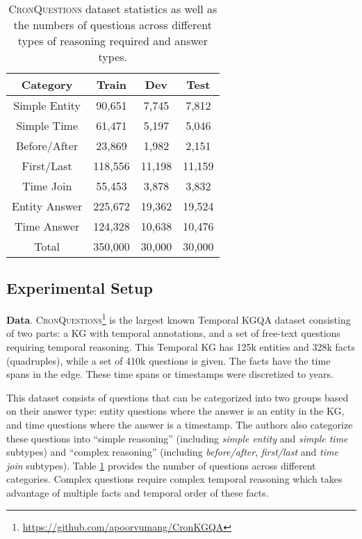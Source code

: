 \documentclass[11pt]{article}
\newcommand{\xhdr}[1]{{\noindent\bfseries #1}.}
\newcommand{\peng}[1]{{{\color{purple!60!blue}{[peng: #1]}}}}
\begin{document}
\begin{table}[!ht]
    \centering 
    \small
    \begin{tabular}{c|c|c|c}
    \hline
    Category & Train & Dev &  Test \\ \hline \hline
    Simple Entity & 90,651 & 7,745 & 7,812 \\ 
    Simple Time & 61,471 & 5,197 & 5,046 \\ 
    Before/After & 23,869 & 1,982 & 2,151\\ 
    First/Last& 118,556& 11,198& 11,159\\ 
    Time Join& 55,453& 3,878& 3,832\\ 
    \hline  
    Entity Answer & 225,672&  19,362&  19,524\\ 
    Time Answer&  124,328&  10,638&  10,476\\ 
    \hline 
    Total&  350,000&  30,000&  30,000\\ 
    \hline 
    \end{tabular}
    \caption{\textsc{CronQuestions} dataset statistics as well as the numbers of questions across different types of reasoning required and answer types.}
    \label{DatasetStats}
\end{table}

\subsection{Experimental Setup}

\xhdr{Data} \textsc{CronQuestions}\footnote{\url{https://github.com/apoorvumang/CronKGQA}} is the largest known Temporal KGQA dataset consisting of two parts: a KG with temporal annotations, and a set of free-text questions requiring temporal reasoning. This Temporal KG has 125k entities and 328k facts (quadruples), while a set of 410k questions is given. The facts have the time spans in the edge. These time spans or timestamps were discretized to years.


This dataset consists of questions that can be categorized into two groups based on their answer type: entity questions where the answer is an entity in the KG, and time questions where the answer is a timestamp.
The authors also categorize these questions into ``simple reasoning'' (including \textit{simple entity} and \textit{simple time} subtypes) and ``complex reasoning'' (including \textit{before/after}, \textit{first/last} and \textit{time join} subtypes). 
Table \ref{DatasetStats} provides the number of questions across different categories. Complex questions require complex temporal reasoning which takes advantage of multiple facts and temporal order of these facts.
\end{document}
